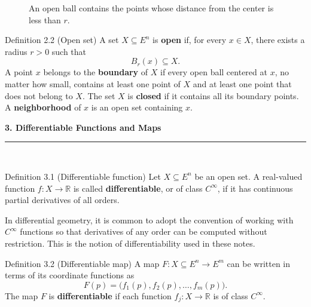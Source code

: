 \documentclass[11pt,letterpaper]{article}
\newcommand{\manualsection}[1]{%
  \Needspace{12\baselineskip}%
  \vspace{0.35cm}
  {\Large\bfseries\color{blackmain} #1}\\[2pt]
  {\color{orangeacc}\rule{\linewidth}{1.4pt}}\\[0.25cm]
}
\newcommand{\term}[1]{\textbf{\color{orangeacc}#1}}
\newcommand{\termb}[1]{\textbf{\color{blackmain}#1}}
\begin{document}
\begin{figure}[htbp]
\centering
{}
\caption{An open ball contains the points whose distance from the center is less than $r$.}
\label{fig:open-ball}
\end{figure}
\FloatBarrier

\begin{infobox}[orangeacc]{Definition 2.2 (Open set)}
A set $X\subseteq E^n$ is \term{open} if, for every $x\in X$, there exists a
radius $r>0$ such that
\begin{equation}
  B_r(x)\subseteq X.
\end{equation}
A point $x$ belongs to the \termb{boundary} of $X$ if every open ball centered at
$x$, no matter how small, contains at least one point of $X$ and at least one point
that does not belong to $X$. The set $X$ is \term{closed} if it contains all its
boundary points. A \term{neighborhood} of $x$ is an open set containing $x$.
\end{infobox}

\manualsection{3. Differentiable Functions and Maps}

\begin{infobox}[blackmain]{Definition 3.1 (Differentiable function)}
Let $X\subseteq E^n$ be an open set. A real-valued function
$f:X\to\mathbb R$ is called \term{differentiable}, or of class $C^\infty$, if it
has continuous partial derivatives of all orders.
\end{infobox}

In differential geometry, it is common to adopt the convention of working with
$C^\infty$ functions so that derivatives of any order can be computed without
restriction. This is the notion of differentiability used in these notes.

\begin{infobox}[orangeacc]{Definition 3.2 (Differentiable map)}
A map $F:X\subseteq E^n\to E^m$ can be written in terms of its coordinate
functions as
\begin{equation}
  F(p)=\bigl(f_1(p),f_2(p),\ldots,f_m(p)\bigr).
\end{equation}
The map $F$ is \term{differentiable} if each function
$f_j:X\to\mathbb R$ is of class $C^\infty$.
\end{infobox}
\end{document}

